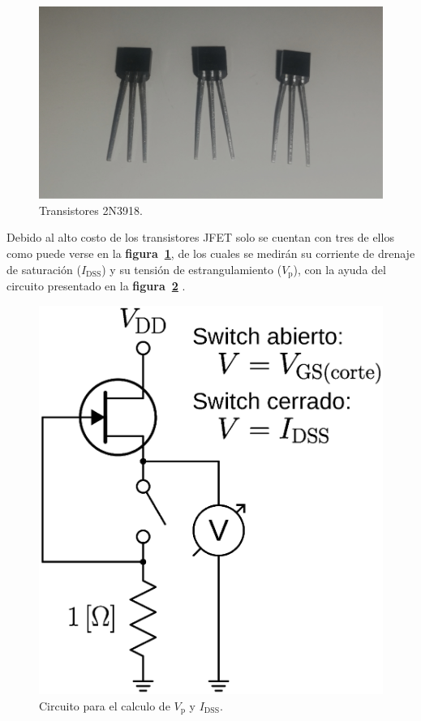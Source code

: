 \begin{figure}[!ht]
\centering
\includegraphics[scale=0.04]{diagramas/figura09.eps}
\caption{Transistores 2N3918.}
\label{figura09}
\end{figure}

Debido al alto costo de los transistores JFET solo se cuentan con tres de ellos
como puede verse en la \textbf{figura~\ref{figura09}}, de los cuales se medirán
su corriente de drenaje de saturación ($I_{\text{DSS}}$) y su tensión de
estrangulamiento ($V_{\text{p}}$), con la ayuda del circuito presentado en la
\textbf{figura~\ref{figura10}} \cite{measuring}.

\begin{figure}[!ht]
\centering
\includegraphics[scale=0.30]{diagramas/figura10.eps}
\caption{Circuito para el calculo de $V_{\text{p}}$ y $I_{\text{DSS}}$.}
\label{figura10}
\end{figure}

